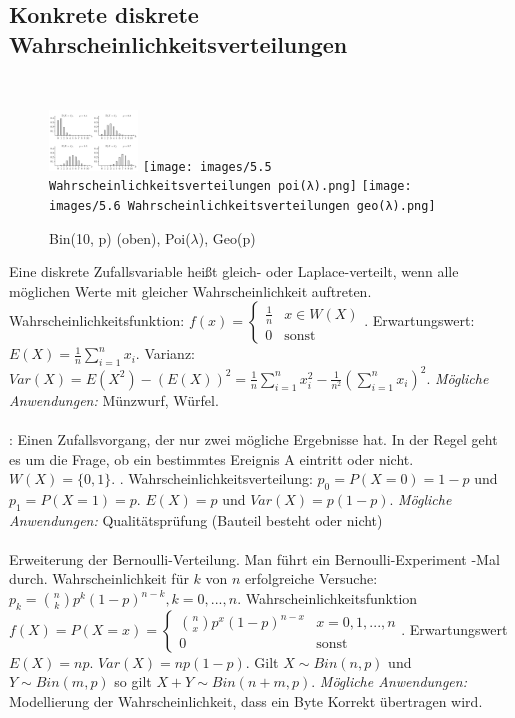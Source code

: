 \subsection{Konkrete diskrete Wahrscheinlichkeitsverteilungen}
\,
\begin{figure}
    \vspace{-7mm}
    \centering
    \includegraphics[width=0.21\textwidth]{images/5.3 Wahrscheinlichkeitsverteilungen bin(10,p).png}
    \texttt{[image: images/5.5 Wahrscheinlichkeitsverteilungen poi(λ).png]}
    \texttt{[image: images/5.6 Wahrscheinlichkeitsverteilungen geo(λ).png]}
    \caption{Bin(10, p) (oben), Poi($\lambda$), Geo(p)}
    \vspace{-26mm}
    \label{fig:disk_dist}
\end{figure}
 Eine diskrete Zufallsvariable heißt gleich- oder Laplace-verteilt, wenn alle möglichen Werte mit gleicher Wahrscheinlichkeit auftreten. Wahrscheinlichkeitsfunktion: $f(x) = \begin{cases}
    \frac{1}{n}&x\in W(X)\\
    0&\text{sonst}
\end{cases}$. Erwartungswert: $E(X) = \frac{1}{n}\sum_{i=1}^nx_i$. Varianz: $Var(X) = E(X^2) - (E(X))^2 = \frac{1}{n}\sum_{i=1}^nx_i^2 - \frac{1}{n^2}(\sum_{i=1}^nx_i)^2$. \emph{Mögliche Anwendungen:} Münzwurf, Würfel. \\\\
: Einen Zufallsvorgang, der nur zwei mögliche Ergebnisse hat. In der Regel geht es um die Frage, ob ein bestimmtes Ereignis A eintritt oder nicht. $W(X) = \{0,1\}$. . Wahrscheinlichkeitsverteilung: $p_0 = P(X=0) = 1 - p$ und $p_1 = P(X=1) = p$. $E(X) = p$ und $Var(X) = p(1-p)$. \emph{Mögliche Anwendungen:} Qualitätsprüfung (Bauteil besteht oder nicht)\\\\
 Erweiterung der Bernoulli-Verteilung. Man führt ein Bernoulli-Experiment -Mal durch. Wahrscheinlichkeit für $k$ von $n$ erfolgreiche Versuche: $p_k = \binom{n}{k} p^k  (1-p)^{n-k}, k = 0, ..., n$. Wahrscheinlichkeitsfunktion $f(X) = P(X = x) = \begin{cases}
    \binom{n}{x} p^x  (1-p)^{n-x} & x = 0, 1, ..., n\\
    0 & \text{sonst}
\end{cases}$. Erwartungswert $E(X) = np$. $Var(X) = np(1-p)$. Gilt $X \sim Bin(n, p)$ und $Y \sim Bin(m, p)$ so gilt $X + Y \sim Bin(n + m, p)$. \emph{Mögliche Anwendungen:} Modellierung der Wahrscheinlichkeit, dass ein Byte Korrekt übertragen wird.\\\\
